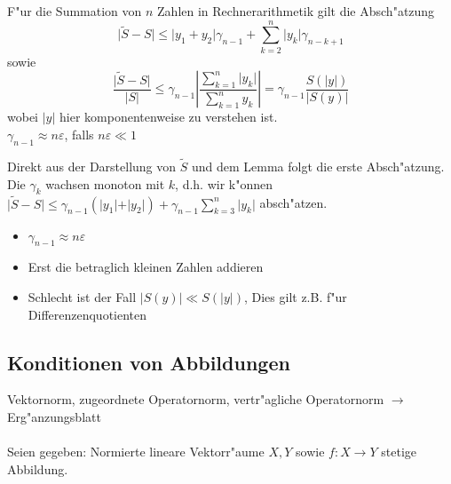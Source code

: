 \documentclass{scrartcl}
\begin{document}
\begin{Thm}
F"ur die Summation von $n$ Zahlen in Rechnerarithmetik gilt die Absch"atzung
$$ \vert \tilde{S} - S \vert \leq \vert y_1 + y_2 \vert \gamma_{n-1} + \sum\limits_{k=2}^n \vert y_k \vert \gamma_{n-k+1} $$
sowie
$$ \frac{ \vert \tilde{S} - S \vert }{\vert S \vert } \leq \gamma_{n-1} \left\vert \frac{ \sum\limits_{k=1}^n \vert y_k \vert }{ \sum\limits_{k=1}^n y_k } \right\vert = \gamma_{n-1} \frac{S(\vert y \vert)}{\vert S(y) \vert }$$
wobei $\vert y \vert$ hier komponentenweise zu verstehen ist. \\ 
 $\gamma_{n-1} \approx n \varepsilon$, falls $n \varepsilon \ll 1$
\end{Thm}
\begin{Bew}
Direkt aus der Darstellung von $\tilde{S}$ und dem Lemma folgt die erste Absch"atzung. \\
Die $\gamma_k$ wachsen monoton mit $k$, d.h. wir k"onnen $\vert \tilde{S} - S \vert \leq \gamma_{n-1} (\vert y_1 \vert + \vert y_2 \vert ) + \gamma_{n-1} \sum\limits_{k=3}^n \vert y_k \vert$ absch"atzen.
\end{Bew} 
\begin{itemize}
\item $\gamma_{n-1} \approx n \varepsilon$
\item Erst die betraglich kleinen Zahlen addieren
\item Schlecht ist der Fall $\vert S(y) \vert \ll S(\vert y \vert)$, Dies gilt z.B. f"ur Differenzenquotienten
\end{itemize}

\subsection{Konditionen von Abbildungen}

  Vektornorm, zugeordnete Operatornorm, vertr"agliche Operatornorm $\rightarrow$ Erg"anzungsblatt \\ \\
 Seien gegeben: Normierte lineare Vektorr"aume $X,Y$ sowie $f: X \rightarrow Y$ stetige Abbildung.
 
\end{document}
